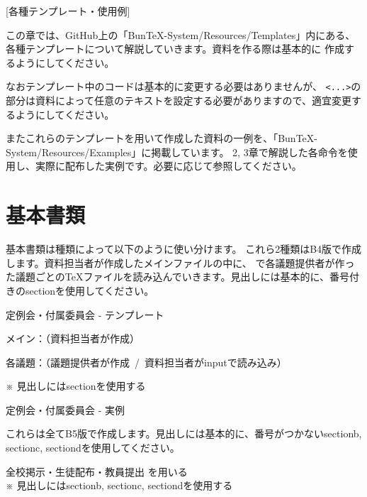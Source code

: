 \newpage
\pagestyle{leaflet}
[各種テンプレート・使用例]
\begin{multicols*}{2}
この章では、GitHub上の「BunTeX-System/Resources/Templates」内にある、
各種テンプレートについて解説していきます。資料を作る際は基本的に
作成するようにしてください。

なおテンプレート中のコードは基本的に変更する必要はありませんが、
\verb|<...>|の部分は資料によって任意のテキストを設定する必要がありますので、適宜変更するようにしてください。

またこれらのテンプレートを用いて作成した資料の一例を、「BunTeX-System/Resources/Examples」に掲載しています。
2, 3章で解説した各命令を使用し、実際に配布した実例です。必要に応じて参照してください。

\section{基本書類}
基本書類は種類によって以下のように使い分けます。
これら2種類はB4版で作成します。資料担当者が作成したメインファイルの中に、\verb||
で各議題提供者が作った議題ごとの\TeX ファイルを読み込んでいきます。見出しには基本的に、番号付きのsectionを使用してください。
\begin{framebox-simple}{定例会・付属委員会 - テンプレート}
\begin{reitemize}
    \item メイン：（資料担当者が作成）
    \item 各議題：（議題提供者が作成~/~資料担当者がinputで読み込み）
\end{reitemize}
\noindent ※ 見出しにはsectionを使用する
\end{framebox-simple}
\begin{framebox-simple}{定例会・付属委員会 - 実例}
    \begin{reitemize}
        \item {}
    \end{reitemize}
\end{framebox-simple}

これらは全てB5版で作成します。見出しには基本的に、番号がつかないsectionb, sectionc, sectiondを使用してください。
\begin{framebox-simple}{全校掲示・生徒配布・教員提出}
を用いる\\
\noindent ※ 見出しにはsectionb, sectionc, sectiondを使用する
\end{framebox-simple}


\end{multicols*}
